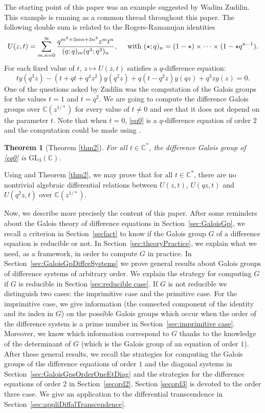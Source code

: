 \documentclass[a4paper,11pt]{amsart}
\newcommand{\GL}{\operatorname{GL}}
\newtheorem*{thmintro}{Theorem}
\def\GL{\mathrm{GL}}
\def\C{\mathbb{C}}
\begin{document}
The starting point of this paper was  an example suggested by Wadim Zudilin. This example is  running as a common thread throughout this paper. The following double sum is related to the Rogers-Ramanujan identities 
$$U(z,t)=\displaystyle \sum_{m,n=0}^{\infty}\frac{q^{m^2+3mn+3n^2} z^{m}t^{n}}{(q;q)_m (q^3;q^3)_n}, \quad \hbox{ with } (\star;q)_n=(1-\star)\times \dots \times (1-\star q^{n-1}).$$
For each fixed value of $t$, $z\mapsto U(z,t)$ satisfies a $q$-difference equation:
\begin{equation}\label{eq0}
ty(q^3 z)  -(t+qt+q^4 z^2)y(q^2 z) +q(t-q^2 z)y(qz) +q^3 z y(z)=0.
\end{equation}
One of the questions asked by Zudilin was the computation of the Galois groups for the values $t=1$ and $t=q^2$. We are going to compute the difference Galois groups over $\C(z^{1/*})$ for every value of $t\neq 0$ and see that it does not depend on the parameter $t$.  Note that when $t=0$, \eqref{eq0} is a $q$-difference equation of order $2$ and the computation could be made using \cite{hendriks1998algorithm}. 
\begin{thmintro}[Theorem \ref{thm2}]
For all $t\in \C^*$, the difference Galois group of \eqref{eq0} is $\GL_3 (\C)$.  
\end{thmintro}

Using \cite[Corollary 3.1]{dreyfus2021functional} and Theorem \ref{thm2}, we may  prove that for all $t\in \C^*$,  there are no nontrivial algebraic differential relations between $U(z,t)$,  $U(qz,t)$ and $U(q^2 z,t)$ over $\C(z^{1/*})$.



Now, we describe more precisely the content of this paper.  After some reminders about the Galois theory of difference equations in Section~\ref{sec:GaloisGp}, we recall a criterion in Section~\ref{secfact} to know if the Galois group $G$ of a difference equation is reducible or not. In Section~\ref{sec:theoryPractice}, we explain what we need, as a framework, in order to compute $G$ in practice. In Section~\ref{sec:GaloisGpDiffceSystems} we prove general results about Galois groups of difference systems of arbitrary order. We explain the strategy for computing $G$ if $G$ is reducible in Section \ref{sec:reducible case}. If $G$ is not reducible we distinguish two cases: the imprimitive case and the primitive case. For the imprimitive case, we give information (the connected component of the identity and its index in $G$) on the possible  Galois groups which occur when the order of the difference system is a prime number in Section~\ref{sec:imprimitive case}. Moreover, we know which information correspond to $G$ thanks to the knowledge of the determinant of $G$ (which is the Galois group of an equation of order $1$). 
After these general results, we recall the strategies for computing the Galois groups of the difference equations of order $1$ and the diagonal systems in Section~\ref{sec:GaloisGpsOrderOneEtDiag} and the strategies for the difference equations of order $2$ in Section~\ref{secord2}. Section \ref{secord3} is devoted to the order three case. We give an application to the differential transcendence in Section~\ref{sec:appliDiffalTranscendence}.
\end{document}
